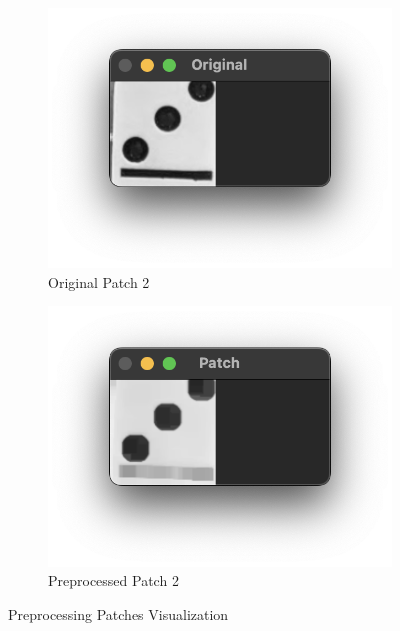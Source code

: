 \documentclass[12pt]{article}
\begin{document}
    \begin{figure}[!h]
        \ContinuedFloat
        \centering
        \begin{subfigure}{.5\textwidth}
            \centering
            \includegraphics[width=0.9\linewidth]{images/patch_preprocessing/original2.png}
            \caption{Original Patch 2}
            \label{fig:op-2}
        \end{subfigure}%
        \begin{subfigure}{.5\textwidth}
            \centering
            \includegraphics[width=0.9\linewidth]
            {images/patch_preprocessing/preproc2.png}
            \caption{Preprocessed Patch 2}
            \label{fig:pp-2}
        \end{subfigure}
        \caption{Preprocessing Patches Visualization}
    \end{figure}
\end{document}
